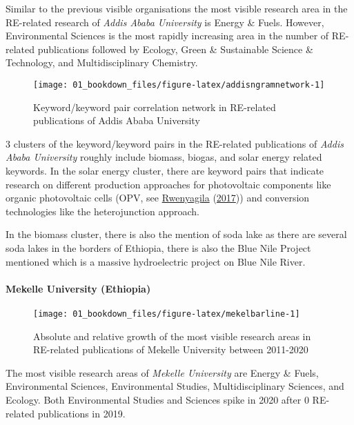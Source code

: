 \documentclass[12pt,twoside]{report}
\let\oldparagraph\paragraph
\renewcommand{\paragraph}[1]{\oldparagraph{#1}\mbox{}}
\begin{document}
Similar to the previous visible organisations the most visible research area in the RE-related research of \emph{Addis Ababa University} is Energy \& Fuels. However, Environmental Sciences is the most rapidly increasing area in the number of RE-related publications followed by Ecology, Green \& Sustainable Science \& Technology, and Multidisciplinary Chemistry.

\begin{figure}
\texttt{[image: 01\_bookdown\_files/figure-latex/addisngramnetwork-1]} \caption{Keyword/keyword pair correlation network in RE-related publications of Addis Ababa University}\label{fig:addisngramnetwork}
\end{figure}

3 clusters of the keyword/keyword pairs in the RE-related publications of \emph{Addis Ababa University} roughly include biomass, biogas, and solar energy related keywords. In the solar energy cluster, there are keyword pairs that indicate research on different production approaches for photovoltaic components like organic photovoltaic cells (OPV, see \protect\hyperlink{ref-rwenyagila2017}{Rwenyagila} (\protect\hyperlink{ref-rwenyagila2017}{2017})) and conversion technologies like the heterojunction approach.

In the biomass cluster, there is also the mention of soda lake as there are several soda lakes in the borders of Ethiopia, there is also the Blue Nile Project mentioned which is a massive hydroelectric project on Blue Nile River.

\hypertarget{mekelle-university-ethiopia}{%
\paragraph{Mekelle University (Ethiopia)}\label{mekelle-university-ethiopia}}

\begin{figure}
\texttt{[image: 01\_bookdown\_files/figure-latex/mekelbarline-1]} \caption{Absolute and relative growth of the most visible research areas in RE-related publications of Mekelle University between 2011-2020}\label{fig:mekelbarline}
\end{figure}

The most visible research areas of \emph{Mekelle University} are Energy \& Fuels, Environmental Sciences, Environmental Studies, Multidisciplinary Sciences, and Ecology.
Both Environmental Studies and Sciences spike in 2020 after 0 RE-related publications in 2019.
\end{document}
